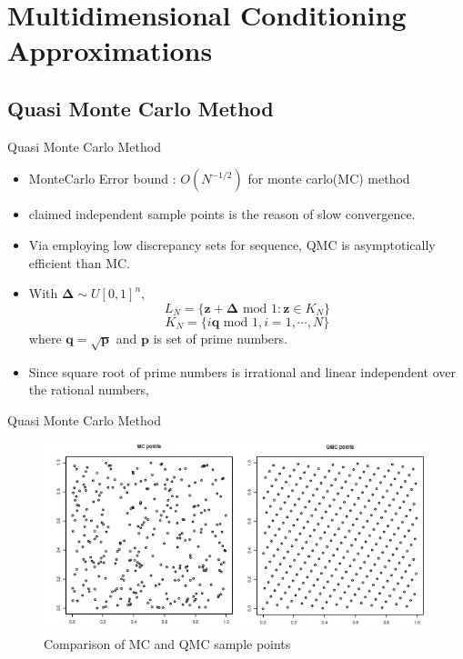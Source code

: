 \section{Multidimensional Conditioning Approximations}

\subsection{Quasi Monte Carlo Method}

\begin{frame}{Quasi Monte Carlo Method}
\begin{itemize}
	\item MonteCarlo Error bound : $O(N^{-1/2})$ for monte carlo(MC) method
	\item \citet{genz2009computation} claimed independent sample points is the reason of slow convergence.
	\item Via employing low discrepancy sets for sequence, QMC is asymptotically efficient than MC.
	\item With $\boldsymbol{\Delta}\sim U[0,1]^n$,
	$$L_N=\{\mathbf{z}+\boldsymbol{\Delta}\text{ mod }1:\mathbf{z}\in K_N\}$$
	$$K_N=\{i\mathbf{q}\text{ mod }1,i=1,\cdots,N\}$$
	where $\mathbf{q}=\sqrt{\mathbf{p}}$ and $\mathbf{p}$ is set of prime numbers.
	\item Since square root of prime numbers is irrational and linear independent over the rational numbers, 
\end{itemize}
\end{frame}

\begin{frame}{Quasi Monte Carlo Method}
\begin{figure}[ht]
	\centering
	\includegraphics[width=\linewidth]{figs/QMC.jpg}
	\caption{Comparison of MC and QMC sample points\citep{genz2009computation}}
	\label{fig:QMC}
\end{figure}
\end{frame}

